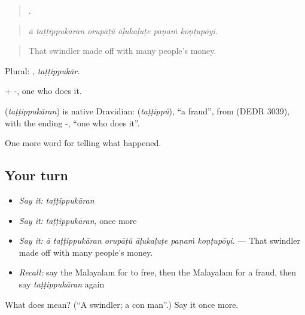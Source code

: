 \begin{quote}
     .
\end{quote}

\begin{quote}
\emph{ā taṭṭippukāran orupāṭŭ āḷukaḷuṭe paṇaṁ koṇṭupōyi.}
\end{quote}

\begin{quote}
That swindler made off with many people's money.
\end{quote}

Plural: , \emph{taṭṭippukār}.

 + -, one who does it.

\begin{cousinweb}
\textbf{} (\emph{taṭṭippukāran}) is native Dravidian:  (\emph{taṭṭippŭ}), \textquotedblleft{}a fraud\textquotedblright{}, from  (DEDR 3039), with the ending -, \textquotedblleft{}one who does it\textquotedblright{}.
\end{cousinweb}

\begin{grammarlens}[title={What you've built}]
One more word for telling what happened.
\end{grammarlens}

\subsection*{Your turn}
\begin{itemize}
\raggedright
  \item \emph{Say it:} \emph{taṭṭippukāran}
  \item \emph{Say it:} \emph{taṭṭippukāran}, once more
  \item \emph{Say it:} \emph{ā taṭṭippukāran orupāṭŭ āḷukaḷuṭe paṇaṁ koṇṭupōyi.} — That swindler made off with many people's money.
  \item \emph{Recall:} say the Malayalam for to free, then the Malayalam for a fraud, then say \emph{taṭṭippukāran} again
\end{itemize}

\begin{tcolorbox}[breakable,colback=teal!4,colframe=teal!35!black,title={Before you move on}]
What does  mean? (\textquotedblleft{}A swindler; a con man\textquotedblright{}.) Say it once more.
\end{tcolorbox}
